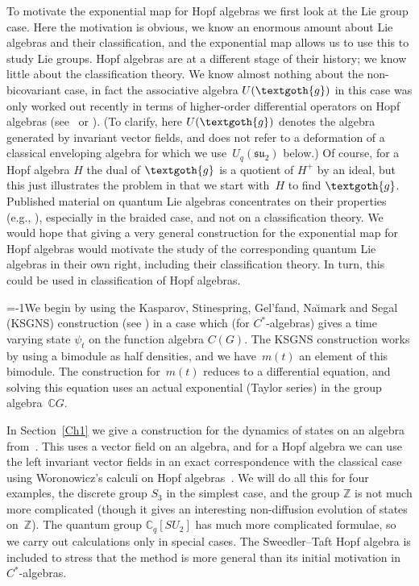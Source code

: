 \documentclass[10pt,a4paper]{amsart}
\numberwithin{equation}{section}
\newcommand{\C}{\mathbb{C}}
\newcommand{\Z}{\mathbb{Z}}
\newcommand{\<}{\langle}
\renewcommand{\>}{\rangle}
\begin{document}
To motivate the exponential map for Hopf algebras we first look at the Lie group case. Here the motivation is obvious, we know an enormous amount about Lie algebras and their classification, and the exponential map allows us to use this to study Lie groups. Hopf algebras are at a different stage of their history; we know little about the classification theory. We know almost nothing about the non-bicovariant case, in fact the associative algebra $ U(\textgoth{g}) $ in this case was only worked out recently in terms of higher-order differential operators on Hopf algebras (see~\cite{Bgeholom} or \cite[p.~515]{BMbook}). (To clarify, here $U(\textgoth{g})$ denotes the algebra generated by invariant vector fields, and does not refer to a deformation of a classical enveloping algebra for which we use~$ U_{q}({\mathfrak{su}}_{2}) $ below.) Of course, for a Hopf algebra $ H $ the dual of $\textgoth{g}$ is a quotient of $ H^{+} $ by an ideal, but this just illustrates the problem in that we start with~$ H $ to find $\textgoth{g}$. Published material on quantum Lie algebras concentrates on their properties (e.g., \cite{GomMa:blie,Ma:blie}), especially in the braided case, and not on a classification theory. We would hope that giving a very general construction for the exponential map for Hopf algebras would motivate the study of the corresponding quantum Lie algebras in their own right, including their classification theory. In turn, this could be used in classification of Hopf algebras.

\looseness=-1We begin by using the Kasparov, Stinespring, Gel'fand, Na\u{\i}mark and Segal (KSGNS) construction (see \cite{Lance}) in a case which (for $ C^{*}$-algebras) gives a time varying state $ \psi_{t} $ on the function algebra $ C(G) $. The KSGNS construction works by using a bimodule as half densities, and we have~$ m(t) $ an element of this bimodule. The construction for~$ m(t) $ reduces to a differential equation, and solving this equation uses an actual exponential (Taylor series) in the group algebra~$ \C G $.

In Section~\ref{Ch1} we give a construction for the dynamics of states on an algebra from~\cite{Bgeo}. This uses a vector field on an algebra, and for a Hopf algebra we can use the left invariant vector fields in an exact correspondence with the classical case using Woronowicz's calculi on Hopf algebras~\cite{WoroMatl}. We will do all this for four examples, the discrete group $ S_{3} $ in the simplest case, and the group $ \Z $ is not much more complicated (though it gives an interesting non-diffusion evolution of states on~$ \Z $). The quantum group $ \C_{q}[SU_{2}] $ has much more complicated formulae, so we carry out calculations only in special cases. The Sweedler--Taft Hopf algebra is included to stress that the method is more general than its initial motivation in $ C^{*} $-algebras.
\end{document}
